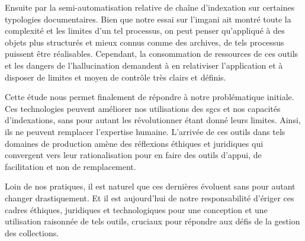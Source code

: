 Ensuite par la semi-automatisation relative de chaîne d'indexation sur certaines typologies documentaires. Bien que notre essai sur l'\gls{imgani} ait montré toute la complexité et les limites d'un tel processus, on peut penser qu'appliqué à des objets plus structurés et mieux connus comme des archives, de tels processus puissent être réalisables. Cependant, la consommation de ressources de ces outils et les dangers de l'hallucination demandent à en relativiser l'application et à disposer de limites et moyen de contrôle très clairs et définis.

Cette étude nous permet finalement de répondre à notre problématique initiale. Ces technologies peuvent améliorer nos utilisations des \glspl{sgc} et nos capacités d'indexations, sans pour autant les révolutionner étant donné leurs limites. Ainsi, ils ne peuvent remplacer l'expertise humaine. L'arrivée de ces outils dans tels domaines de production amène des réflexions éthiques et juridiques qui convergent vers leur rationalisation pour en faire des outils d'appui, de facilitation et non de remplacement. 

Loin de  nos pratiques, il est naturel que ces dernières évoluent sans pour autant changer drastiquement. Et il est aujourd'hui de notre responsabilité d'ériger ces cadres éthiques, juridiques et technologiques pour une conception et une utilisation raisonnée de tels outils, cruciaux pour répondre aux défis de la gestion des collections.
